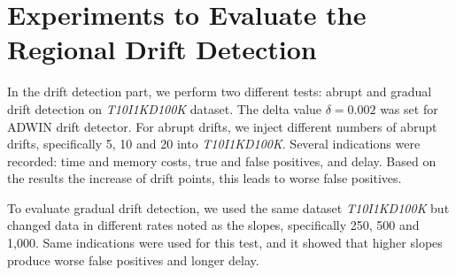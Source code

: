 \section {Experiments to Evaluate the Regional Drift Detection}
In the drift detection part, we perform two different tests: abrupt and gradual drift detection on \textit{T10I1KD100K} dataset. The delta value $\delta=0.002$ was set for ADWIN drift detector. For abrupt drifts, we inject different numbers of abrupt drifts, specifically 5, 10 and 20 into \textit{T10I1KD100K}. Several indications were recorded: time and memory costs, true and false positives, and delay. Based on the results the increase of  drift points, this leads to worse false positives.

To evaluate gradual drift detection, we used the same dataset \textit{T10I1KD100K} but changed data in different rates noted as the slopes, specifically 250, 500 and 1,000. Same indications were used for this test, and it showed that higher slopes produce worse false positives and longer delay.

\begin{table}[h!]
\caption{Abrupt Drift Detection}
\label{tb:abrupt}
\begin{center}
\end{center}
\end{table}


